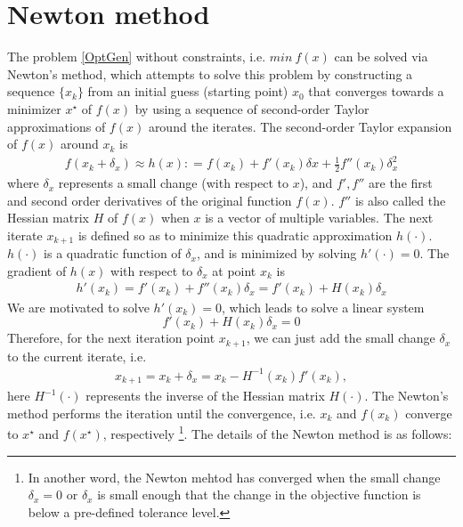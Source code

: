 \section{Newton method}
The problem \ref{OptGen} without constraints, i.e. $min \  f(x)$  can be solved via Newton's method, which attempts to solve this problem by constructing a sequence $\{x_k\}$ from an initial guess (starting point) $x_0$ that converges towards a minimizer $x^\star$ of $f(x)$  by using a sequence of second-order Taylor approximations of $f(x)$ around the iterates. The second-order Taylor expansion of $f(x)$ around $x_k$ is
\begin{align*}
f(x_k + \delta_x) \approx h(x) : = f(x_k) + f'(x_k)\delta x +\frac{1}{2}f''(x_k)\delta_x^2 
\end{align*}
where $\delta_x$ represents a small change (with respect to $x$), and $f', f''$ are the first and second order derivatives of the original function $f(x)$. $f''$ is also called the Hessian matrix $H$ of $f(x)$ when $x$ is a vector of multiple variables. The next iterate $x_{k+1}$ is defined so as to minimize this quadratic approximation $h(\cdot)$. $h(\cdot)$ is a quadratic function of $\delta_x$, and is minimized by solving $h'(\cdot) = 0$. The gradient of $h(x)$ with respect to $\delta_x$ at point $x_k$ is
\begin{align*}
h'(x_k) = f'(x_k) +f''(x_k)\delta_x = f'(x_k) +H(x_k)\delta_x
\end{align*}
We are motivated to solve $h'(x_k) =0$, which leads to solve a linear system
\begin{equation}
	f'(x_k) +H(x_k)\delta_x =0
	\label{HessianEq}
\end{equation}
Therefore, for the next iteration point $x_{k+1}$, we can just add the small change $\delta_x$ to the current iterate, i.e. 
\begin{align*}
	x_{k+1}  = x_k + \delta_x = x_k - H^{-1}(x_k)f'(x_k), 
\end{align*}
here $ H^{-1}(\cdot)$ represents the inverse of the Hessian matrix $H(\cdot)$. The Newton's method performs the iteration until the convergence, i.e. $x_k$ and $f(x_k)$ converge to $x^\star$ and $f(x^\star)$, respectively \footnote{In another word, the Newton mehtod has converged when the small change $\delta_x =0$ or $\delta_x$ is small enough that the change in the objective function is below a pre-defined tolerance level.}. The details of the Newton method is as follows: 
